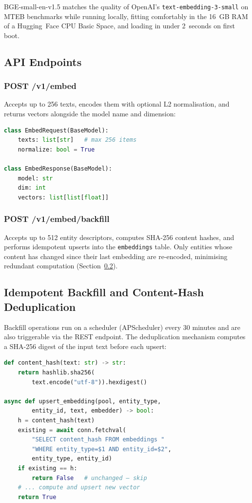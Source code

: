 \documentclass[conference]{IEEEtran}
\begin{document}
BGE-small-en-v1.5 matches the quality of OpenAI's \texttt{text-embedding-3-small}
on MTEB benchmarks \cite{muennighoff2023mteb} while running locally, fitting
comfortably in the 16~GB RAM of a Hugging~Face CPU Basic Space, and loading
in under 2~seconds on first boot.

\subsection{API Endpoints}

\subsubsection{POST /v1/embed}
Accepts up to 256 texts, encodes them with optional L2 normalisation, and
returns vectors alongside the model name and dimension:

\begin{lstlisting}[language=Python, caption={Embed endpoint schema.}]
class EmbedRequest(BaseModel):
    texts: list[str]   # max 256 items
    normalize: bool = True

class EmbedResponse(BaseModel):
    model: str
    dim: int
    vectors: list[list[float]]
\end{lstlisting}

\subsubsection{POST /v1/embed/backfill}
Accepts up to 512 entity descriptors, computes SHA-256 content hashes, and
performs idempotent upserts into the \texttt{embeddings} table. Only entities
whose content has changed since their last embedding are re-encoded, minimising
redundant computation (Section~\ref{sec:dedup}).

\subsection{Idempotent Backfill and Content-Hash Deduplication}
\label{sec:dedup}

Backfill operations run on a scheduler (APScheduler) every 30 minutes and
are also triggerable via the REST endpoint. The deduplication mechanism
computes a SHA-256 digest of the input text before each upsert:

\begin{lstlisting}[language=Python, caption={Content-hash upsert logic.}]
def content_hash(text: str) -> str:
    return hashlib.sha256(
        text.encode("utf-8")).hexdigest()

async def upsert_embedding(pool, entity_type,
        entity_id, text, embedder) -> bool:
    h = content_hash(text)
    existing = await conn.fetchval(
        "SELECT content_hash FROM embeddings "
        "WHERE entity_type=$1 AND entity_id=$2",
        entity_type, entity_id)
    if existing == h:
        return False   # unchanged — skip
    # ... compute and upsert new vector
    return True
\end{lstlisting}
\end{document}
